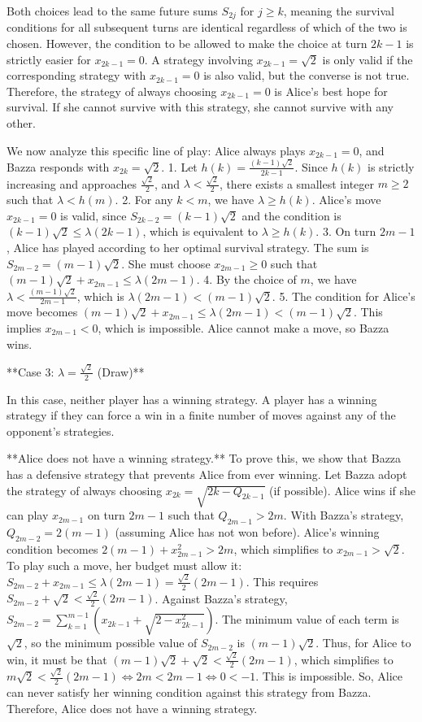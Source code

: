 \documentclass[12pt]{article}
\begin{document}
Both choices lead to the same future sums $S_{2j}$ for $j \ge k$, meaning the survival conditions for all subsequent turns are identical regardless of which of the two is chosen. However, the condition to be allowed to make the choice at turn $2k-1$ is strictly easier for $x_{2k-1}=0$. A strategy involving $x_{2k-1}=\sqrt{2}$ is only valid if the corresponding strategy with $x_{2k-1}=0$ is also valid, but the converse is not true. Therefore, the strategy of always choosing $x_{2k-1}=0$ is Alice's best hope for survival. If she cannot survive with this strategy, she cannot survive with any other.

We now analyze this specific line of play: Alice always plays $x_{2k-1}=0$, and Bazza responds with $x_{2k}=\sqrt{2}$.
1.  Let $h(k) = \frac{(k-1)\sqrt{2}}{2k-1}$. Since $h(k)$ is strictly increasing and approaches $\frac{\sqrt{2}}{2}$, and $\lambda < \frac{\sqrt{2}}{2}$, there exists a smallest integer $m \ge 2$ such that $\lambda < h(m)$.
2.  For any $k < m$, we have $\lambda \ge h(k)$. Alice's move $x_{2k-1}=0$ is valid, since $S_{2k-2}=(k-1)\sqrt{2}$ and the condition is $(k-1)\sqrt{2} \le \lambda(2k-1)$, which is equivalent to $\lambda \ge h(k)$.
3.  On turn $2m-1$, Alice has played according to her optimal survival strategy. The sum is $S_{2m-2}=(m-1)\sqrt{2}$. She must choose $x_{2m-1} \ge 0$ such that $(m-1)\sqrt{2} + x_{2m-1} \le \lambda(2m-1)$.
4.  By the choice of $m$, we have $\lambda < \frac{(m-1)\sqrt{2}}{2m-1}$, which is $\lambda(2m-1) < (m-1)\sqrt{2}$.
5.  The condition for Alice's move becomes $(m-1)\sqrt{2} + x_{2m-1} \le \lambda(2m-1) < (m-1)\sqrt{2}$. This implies $x_{2m-1} < 0$, which is impossible.
Alice cannot make a move, so Bazza wins.

**Case 3: $\lambda = \frac{\sqrt{2}}{2}$ (Draw)**

In this case, neither player has a winning strategy. A player has a winning strategy if they can force a win in a finite number of moves against any of the opponent's strategies.

**Alice does not have a winning strategy.**
To prove this, we show that Bazza has a defensive strategy that prevents Alice from ever winning. Let Bazza adopt the strategy of always choosing $x_{2k} = \sqrt{2k - Q_{2k-1}}$ (if possible).
Alice wins if she can play $x_{2m-1}$ on turn $2m-1$ such that $Q_{2m-1} > 2m$. With Bazza's strategy, $Q_{2m-2}=2(m-1)$ (assuming Alice has not won before). Alice's winning condition becomes $2(m-1)+x_{2m-1}^2 > 2m$, which simplifies to $x_{2m-1} > \sqrt{2}$.
To play such a move, her budget must allow it: $S_{2m-2} + x_{2m-1} \le \lambda(2m-1) = \frac{\sqrt{2}}{2}(2m-1)$.
This requires $S_{2m-2} + \sqrt{2} < \frac{\sqrt{2}}{2}(2m-1)$.
Against Bazza's strategy, $S_{2m-2} = \sum_{k=1}^{m-1} (x_{2k-1} + \sqrt{2-x_{2k-1}^2})$. The minimum value of each term is $\sqrt{2}$, so the minimum possible value of $S_{2m-2}$ is $(m-1)\sqrt{2}$.
Thus, for Alice to win, it must be that $(m-1)\sqrt{2} + \sqrt{2} < \frac{\sqrt{2}}{2}(2m-1)$, which simplifies to $m\sqrt{2} < \frac{\sqrt{2}}{2}(2m-1) \iff 2m < 2m-1 \iff 0 < -1$. This is impossible.
So, Alice can never satisfy her winning condition against this strategy from Bazza. Therefore, Alice does not have a winning strategy.
\end{document}
